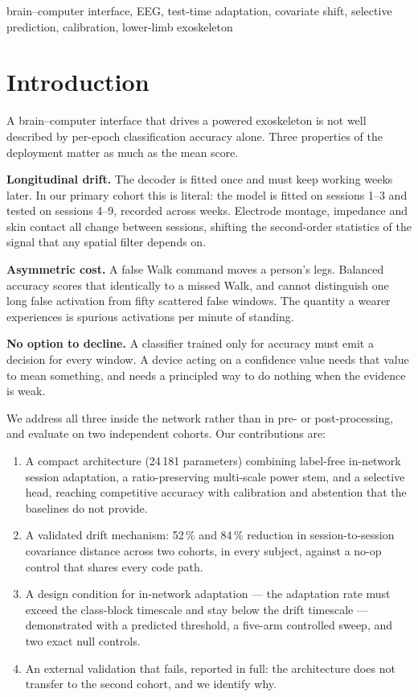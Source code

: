 \documentclass[conference]{IEEEtran}
\begin{document}
\begin{IEEEkeywords}
brain--computer interface, EEG, test-time adaptation, covariate shift, selective
prediction, calibration, lower-limb exoskeleton
\end{IEEEkeywords}

\section{Introduction}

A brain--computer interface that drives a powered exoskeleton is not well
described by per-epoch classification accuracy alone. Three properties of the
deployment matter as much as the mean score.

\textbf{Longitudinal drift.} The decoder is fitted once and must keep working
weeks later. In our primary cohort this is literal: the model is fitted on
sessions 1--3 and tested on sessions 4--9, recorded across weeks. Electrode
montage, impedance and skin contact all change between sessions, shifting the
second-order statistics of the signal that any spatial filter depends on.

\textbf{Asymmetric cost.} A false Walk command moves a person's legs. Balanced
accuracy scores that identically to a missed Walk, and cannot distinguish one
long false activation from fifty scattered false windows. The quantity a wearer
experiences is spurious activations per minute of standing.

\textbf{No option to decline.} A classifier trained only for accuracy must emit a
decision for every window. A device acting on a confidence value needs that value
to mean something, and needs a principled way to do nothing when the evidence is
weak.

We address all three inside the network rather than in pre- or post-processing,
and evaluate on two independent cohorts. Our contributions are:

\begin{enumerate}
\item A compact architecture (24\,181 parameters) combining label-free in-network
      session adaptation, a ratio-preserving multi-scale power stem, and a
      selective head, reaching competitive accuracy with calibration and
      abstention that the baselines do not provide.
\item A validated drift mechanism: 52\,\% and 84\,\% reduction in
      session-to-session covariance distance across two cohorts, in every
      subject, against a no-op control that shares every code path.
\item A design condition for in-network adaptation --- the adaptation rate must
      exceed the class-block timescale and stay below the drift timescale ---
      demonstrated with a predicted threshold, a five-arm controlled sweep, and
      two exact null controls.
\item An external validation that fails, reported in full: the architecture does
      not transfer to the second cohort, and we identify why.
\end{enumerate}
\end{document}
